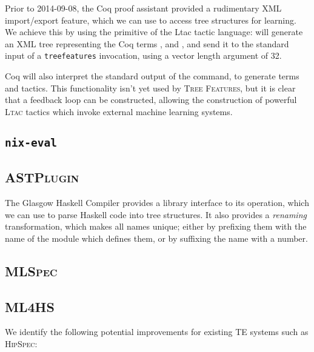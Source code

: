 \documentclass[]{article}
\begin{document}
Prior to 2014-09-08, the Coq proof assistant provided a rudimentary XML import/export feature, which we can use to access tree structures for learning. We achieve this by using the  primitive of the Ltac tactic language:  will generate an XML tree representing the Coq terms ,  and , and send it to the standard input of a \texttt{treefeatures} invocation, using a vector length argument of 32.

Coq will also interpret the standard output of the command, to generate terms and tactics. This functionality isn't yet used by \textsc{Tree Features}, but it is clear that a feedback loop can be constructed, allowing the construction of powerful \textsc{Ltac} tactics which invoke external machine learning systems.

\subsection{\texttt{nix-eval}}\label{nixeval}

\subsection{\textsc{ASTPlugin}}\label{astplugin}

The Glasgow Haskell Compiler provides a library interface to its operation, which we can use to parse Haskell code into tree structures. It also provides a \emph{renaming} transformation, which makes all names unique; either by prefixing them with the name of the module which defines them, or by suffixing the name with a number.

\subsection{\textsc{MLSpec}}\label{mlspec}

\subsection{\textsc{ML4HS}}\label{ml4hs}

We identify the following potential improvements for existing TE systems such as \textsc{HipSpec}:
\end{document}
